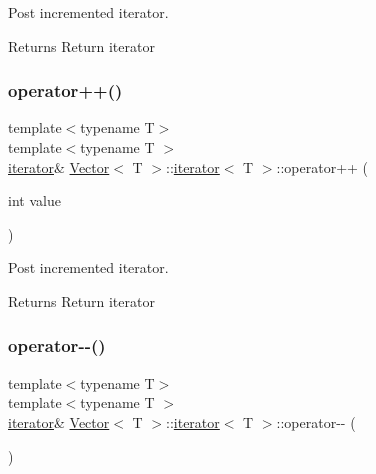 Post incremented iterator. 

\begin{DoxyReturn}{Returns}
Return iterator 
\end{DoxyReturn}
\mbox{\label{classVector_1_1iterator_a8e9cf2d45f325d1ed8979706ca97f498}} 
\subsubsection{\texorpdfstring{operator++()}{operator++()}\hspace{0.1cm}{\footnotesize\ttfamily [4/4]}}
{\footnotesize\ttfamily template$<$typename T$>$ \\
template$<$typename T $>$ \\
\hyperlink{classVector_1_1iterator}{iterator}\& \hyperlink{classVector}{Vector}$<$ T $>$\+::\hyperlink{classVector_1_1iterator}{iterator}$<$ T $>$\+::operator++ (\begin{DoxyParamCaption}\item[{int}]{value }\end{DoxyParamCaption})\hspace{0.3cm}{\ttfamily [inline]}}



Post incremented iterator. 

\begin{DoxyReturn}{Returns}
Return iterator 
\end{DoxyReturn}
\mbox{\label{classVector_1_1iterator_a00fc1009bd761df83fd96b314d07d60d}} 
\subsubsection{\texorpdfstring{operator-\/-\/()}{operator--()}\hspace{0.1cm}{\footnotesize\ttfamily [1/4]}}
{\footnotesize\ttfamily template$<$typename T$>$ \\
template$<$typename T $>$ \\
\hyperlink{classVector_1_1iterator}{iterator}\& \hyperlink{classVector}{Vector}$<$ T $>$\+::\hyperlink{classVector_1_1iterator}{iterator}$<$ T $>$\+::operator-\/-\/ (\begin{DoxyParamCaption}{ }\end{DoxyParamCaption})\hspace{0.3cm}{\ttfamily [inline]}}



